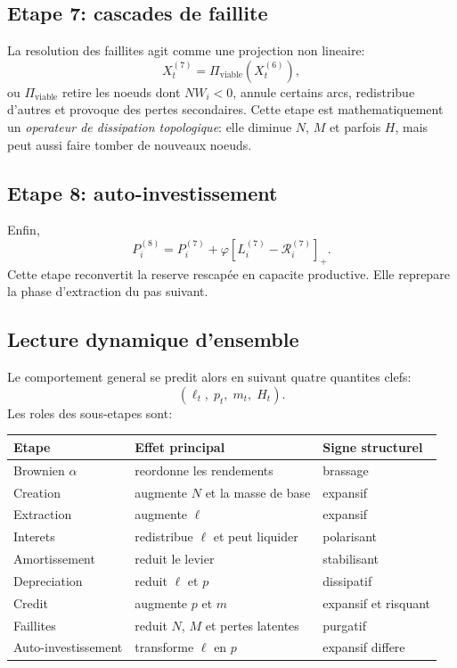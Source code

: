 \documentclass[11pt,a4paper]{article}
\begin{document}
\subsection{Etape 7: cascades de faillite}
La resolution des faillites agit comme une projection non lineaire:
\[
X_t^{(7)} = \Pi_{\mathrm{viable}}(X_t^{(6)}),
\]
ou $\Pi_{\mathrm{viable}}$ retire les noeuds dont $NW_i<0$, annule certains arcs, redistribue d'autres et provoque des pertes secondaires. Cette etape est mathematiquement un \emph{operateur de dissipation topologique}: elle diminue $N$, $M$ et parfois $H$, mais peut aussi faire tomber de nouveaux noeuds.

\subsection{Etape 8: auto-investissement}
Enfin,
\[
P_i^{(8)} = P_i^{(7)} + \varphi[L_i^{(7)}-\mathcal R_i^{(7)}]_+.
\]
Cette etape reconvertit la reserve rescapée en capacite productive. Elle reprepare la phase d'extraction du pas suivant.

\subsection{Lecture dynamique d'ensemble}
Le comportement general se predit alors en suivant quatre quantites clefs:
\[
(\ell_t,\; p_t,\; m_t,\; H_t).
\]
Les roles des sous-etapes sont:
\begin{center}
\begin{tabular}{lll}
\toprule
Etape & Effet principal & Signe structurel \\
\midrule
Brownien $\alpha$ & reordonne les rendements & brassage \\
Creation & augmente $N$ et la masse de base & expansif \\
Extraction & augmente $\ell$ & expansif \\
Interets & redistribue $\ell$ et peut liquider & polarisant \\
Amortissement & reduit le levier & stabilisant \\
Depreciation & reduit $\ell$ et $p$ & dissipatif \\
Credit & augmente $p$ et $m$ & expansif et risquant \\
Faillites & reduit $N$, $M$ et pertes latentes & purgatif \\
Auto-investissement & transforme $\ell$ en $p$ & expansif differe \\
\bottomrule
\end{tabular}
\end{center}
\end{document}
